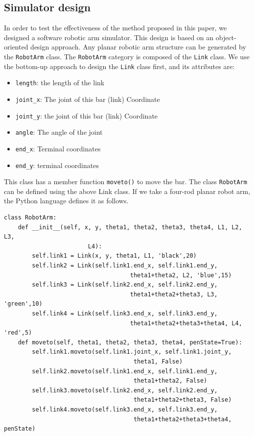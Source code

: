 \documentclass[journal,article,submit,pdftex,moreauthors]{Definitions/mdpi}
\begin{document}
\subsection{Simulator design}
In order to test the effectiveness of the method proposed in this paper, we designed a software robotic arm simulator. This design is based on an object-oriented design approach. Any planar robotic arm structure can be generated by the {\tt RobotArm} class. The {\tt RobotArm} category is composed of the {\tt Link} class. We use the bottom-up approach to design the {\tt Link} class first, and its attributes are:
\begin{itemize}
\item {\tt length}: the length of the link
\item {\tt joint\_x}: The joint of this bar (link)  Coordinate 
\item	{\tt joint\_y}: the joint of this bar (link)  Coordinate 
\item {\tt angle}: The angle of the joint 
\item {\tt end\_x}: Terminal  coordinates 
\item {\tt end\_y}: terminal  coordinates
\end{itemize}

This class has a member function {\tt moveto()} to move the bar.
The class {\tt RobotArm} can be defined using the above Link class. If we take a four-rod planar robot arm, the Python language defines it as follows.

\begin{verbatim}
class RobotArm:
    def __init__(self, x, y, theta1, theta2, theta3, theta4, L1, L2, L3,
                        L4):
        self.link1 = Link(x, y, theta1, L1, 'black',20)
        self.link2 = Link(self.link1.end_x, self.link1.end_y, 
                                    theta1+theta2, L2, 'blue',15)
        self.link3 = Link(self.link2.end_x, self.link2.end_y, 
                                    theta1+theta2+theta3, L3, 'green',10)
        self.link4 = Link(self.link3.end_x, self.link3.end_y, 
                                    theta1+theta2+theta3+theta4, L4, 'red',5)
    def moveto(self, theta1, theta2, theta3, theta4, penState=True):
        self.link1.moveto(self.link1.joint_x, self.link1.joint_y, 
                                     theta1, False)
        self.link2.moveto(self.link1.end_x, self.link1.end_y, 
                                     theta1+theta2, False)
        self.link3.moveto(self.link2.end_x, self.link2.end_y, 
                                     theta1+theta2+theta3, False)
        self.link4.moveto(self.link3.end_x, self.link3.end_y, 
                                     theta1+theta2+theta3+theta4, penState)
\end{verbatim}
\end{document}
